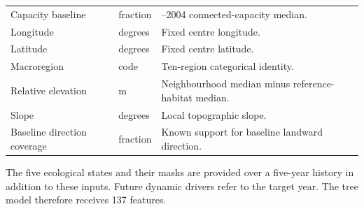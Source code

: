 \begin{longtable}{>{\raggedright\arraybackslash}p{52mm}>{\raggedright\arraybackslash}p{23mm}>{\raggedright\arraybackslash}p{82mm}}
Capacity baseline & fraction & 2000--2004 connected-capacity median.\\
Longitude & degrees & Fixed centre longitude.\\
Latitude & degrees & Fixed centre latitude.\\
Macroregion & code & Ten-region categorical identity.\\
Relative elevation & m & Neighbourhood median minus reference-habitat median.\\
Slope & degrees & Local topographic slope.\\
Baseline direction coverage & fraction & Known support for baseline landward direction.\\
\end{longtable}
{\small The five ecological states and their masks are provided over a five-year history in addition to these inputs. Future dynamic drivers refer to the target year. The tree model therefore receives 137 features.\par}
\endgroup

